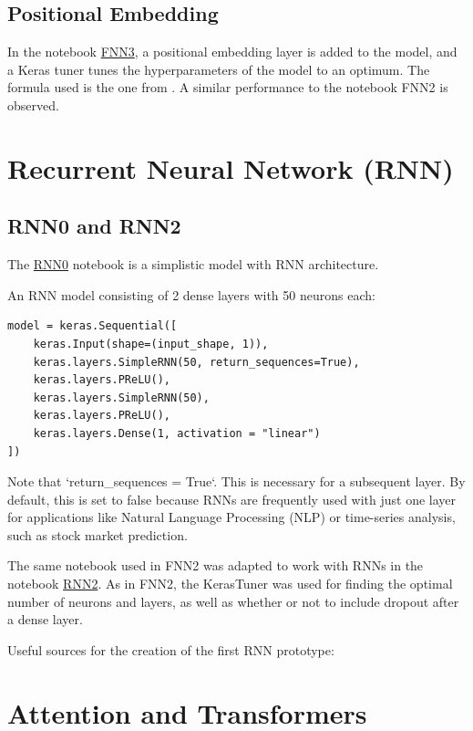 \documentclass{article}
\begin{document}
\subsection{Positional Embedding}

In the notebook \href{https://github.com/AntonStantan/matura/blob/main/FNN/FNN3.ipynb}{FNN3}, a positional embedding layer is added to the model, and a Keras tuner tunes the hyperparameters of the model to an optimum. The formula used is the one from \cite{vaswani2023attentionneed}. A similar performance to the notebook FNN2 is observed.


\section{Recurrent Neural Network (RNN)}

\subsection{RNN0 and RNN2}
The \href{https://github.com/AntonStantan/matura/blob/main/RNN/RNN0.ipynb}{RNN0} notebook is a simplistic model with RNN architecture.

An RNN model consisting of 2 dense layers with 50 neurons each:

\begin{Verbatim}
model = keras.Sequential([
    keras.Input(shape=(input_shape, 1)),
    keras.layers.SimpleRNN(50, return_sequences=True),
    keras.layers.PReLU(),
    keras.layers.SimpleRNN(50),
    keras.layers.PReLU(),
    keras.layers.Dense(1, activation = "linear")
])
\end{Verbatim}
Note that `return\_sequences = True`. This is necessary for a subsequent layer. By default, this is set to false because RNNs are frequently used with just one layer for applications like Natural Language Processing (NLP) or time-series analysis, such as stock market prediction.

The same notebook used in FNN2 was adapted to work with RNNs in the notebook \href{https://github.com/AntonStantan/matura/blob/main/RNN/RNN2.ipynb}{RNN2}. As in FNN2, the KerasTuner was used for finding the optimal number of neurons and layers, as well as whether or not to include dropout after a dense layer.

Useful sources for the creation of the first RNN prototype:
\cite{bowman2015recursiveneuralnetworkslearn, tensorflow_keras_rnn, ibm_rnn}


\section{Attention and Transformers}
\end{document}
